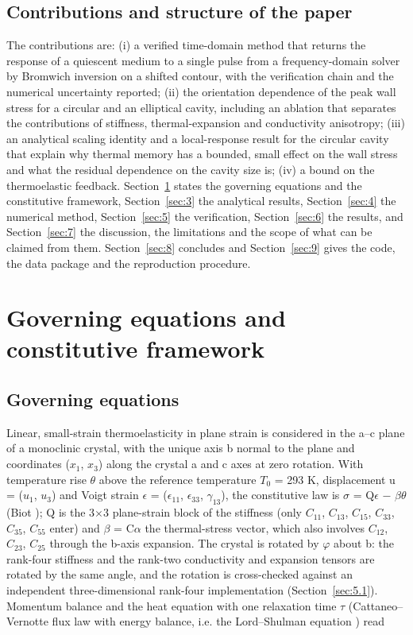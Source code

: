 \documentclass[preprint,12pt]{elsarticle}
\begin{document}
\subsection{Contributions and structure of the paper}
\label{sec:1.4}

The contributions are: (i) a verified time-domain method that returns the response of a quiescent medium to a single pulse from a frequency-domain solver by Bromwich inversion on a shifted contour, with the verification chain and the numerical uncertainty reported; (ii) the orientation dependence of the peak wall stress for a circular and an elliptical cavity, including an ablation that separates the contributions of stiffness, thermal-expansion and conductivity anisotropy; (iii) an analytical scaling identity and a local-response result for the circular cavity that explain why thermal memory has a bounded, small effect on the wall stress and what the residual dependence on the cavity size is; (iv) a bound on the thermoelastic feedback. Section~\ref{sec:2} states the governing equations and the constitutive framework, Section~\ref{sec:3} the analytical results, Section~\ref{sec:4} the numerical method, Section~\ref{sec:5} the verification, Section~\ref{sec:6} the results, and Section~\ref{sec:7} the discussion, the limitations and the scope of what can be claimed from them. Section~\ref{sec:8} concludes and Section~\ref{sec:9} gives the code, the data package and the reproduction procedure.

\section{Governing equations and constitutive framework}
\label{sec:2}

\subsection{Governing equations}
\label{sec:2.1}

Linear, small-strain thermoelasticity in plane strain is considered in the a--c plane of a monoclinic crystal, with the unique axis b normal to the plane and coordinates ($x_{1}$, $x_{3}$) along the crystal a and c axes at zero rotation. With temperature rise $\theta$ above the reference temperature $T_{0}$ = 293 K, displacement u = ($u_{1}$, $u_{3}$) and Voigt strain $\epsilon$ = ($\epsilon_{11}$, $\epsilon_{33}$, $\gamma_{13}$), the constitutive law is $\sigma$ = Q$\epsilon$ $-$ $\beta \theta$ (Biot \cite{biot1956}); Q is the 3$\times$3 plane-strain block of the stiffness (only $C_{11}$, $C_{13}$, $C_{15}$, $C_{33}$, $C_{35}$, $C_{55}$ enter) and $\beta$ = C$\alpha$ the thermal-stress vector, which also involves $C_{12}$, $C_{23}$, $C_{25}$ through the b-axis expansion. The crystal is rotated by $\varphi$ about b: the rank-four stiffness and the rank-two conductivity and expansion tensors are rotated by the same angle, and the rotation is cross-checked against an independent three-dimensional rank-four implementation (Section~\ref{sec:5.1}). Momentum balance and the heat equation with one relaxation time $\tau$ (Cattaneo--Vernotte flux law with energy balance, i.e. the Lord--Shulman equation \cite{lord1967,dhaliwal1980}) read
\end{document}
